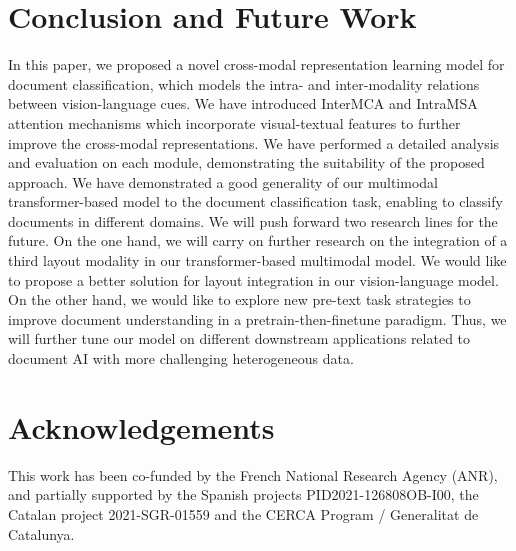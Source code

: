 \documentclass[preprint,review,12pt]{elsarticle}
\begin{document}
\section{Conclusion and Future Work}
In this paper, we proposed a novel cross-modal representation learning model for document classification, which models the intra- and inter-modality relations between vision-language cues. We have introduced InterMCA and IntraMSA attention mechanisms which incorporate visual-textual features to further improve the cross-modal representations. We have performed a detailed analysis and evaluation on each module, demonstrating the suitability of the proposed approach. We have demonstrated a good generality of our multimodal transformer-based model to the document classification task, enabling to classify documents in different domains. We will push forward two research lines for the future. On the one hand, we will carry on further research on the integration of a third layout modality in our transformer-based multimodal model. We would like to propose a better solution for layout integration in our vision-language model. On the other hand, we would like to explore new pre-text task strategies to improve document understanding in a pretrain-then-finetune paradigm. Thus, we will further tune our model on different downstream applications related to document AI with more challenging heterogeneous data.

\section{Acknowledgements}
This work has been co-funded by the French National Research Agency (ANR), and partially supported by the Spanish projects PID2021-126808OB-I00, the Catalan project 2021-SGR-01559  and the CERCA Program / Generalitat de Catalunya.


 
\end{document}
